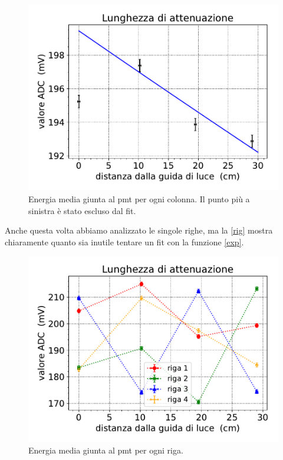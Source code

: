 \begin{figure}[h]
\centering
\includegraphics[width=8 cm]{ecol}
\caption{Energia media giunta al pmt per ogni colonna. Il punto più a sinistra è stato escluso dal fit.}
\label{col}
\end{figure}


Anche questa volta abbiamo analizzato le singole righe, ma la \autoref{rig} mostra chiaramente quanto sia inutile tentare un fit con la funzione \eqref{exp}. 
\begin{figure}[h]
\centering
\includegraphics[width=8 cm]{erig}
\caption{Energia media giunta al pmt per ogni riga.}
\label{rig}
\end{figure}


